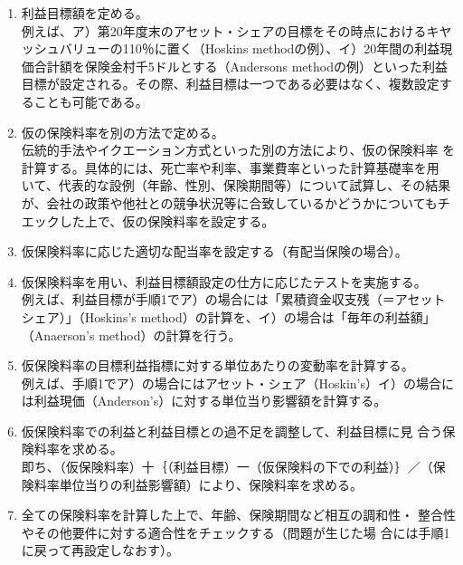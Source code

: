 \documentclass[report,gutter=10mm,fore-edge=10mm,uplatex,dvipdfmx]{jlreq}
\begin{document}
\begin{enumerate}
 \item 利益目標額を定める。\\
例えば、ア）第20年度末のアセット・シェアの目標をその時点におけるキヤッシュバリューの110％に置く（Hoskins methodの例）、イ）20年間の利益現価合計額を保険金村千5ドルとする（Andersons methodの例）といった利益目標が設定される。その際、利益目標は一つである必要はなく、複数設定することも可能である。
 \item 仮の保険料率を別の方法で定める。\\
伝統的手法やイクエーション方式といった別の方法により、仮の保険料率
を計算する。具体的には、死亡率や利率、事業費率といった計算基礎率を用
いて、代表的な設例（年齢、性別、保険期間等）について試算し、その結果
が、会社の政策や他社との競争状況等に合致しているかどうかについてもチ
エックした上で、仮の保険料率を設定する。
 \item 仮保険料率に応じた適切な配当率を設定する（有配当保険の場合）。
 \item 仮保険料率を用い、利益目標額設定の仕方に応じたテストを実施する。\\
例えば、利益目標が手順1でア）の場合には「累積資金収支残（＝アセット
シェア）」（Hoskins’s method）の計算を、イ）の場合は「毎年の利益額」
（Anaerson’s method）の計算を行う。
 \item 仮保険料率の目標利益指標に対する単位あたりの変動率を計算する。\\
例えば、手順1でア）の場合にはアセット・シェア（Hoskin's）イ）の場合に
は利益現価（Anderson’s）に対する単位当り影響額を計算する。
 \item 仮保険料率での利益と利益目標との過不足を調整して、利益目標に見
合う保険料率を求める。\\
即ち、（仮保険料率）十｛（利益目標）一（仮保険料の下での利益）｝／（保
険料率単位当りの利益影響額）により、保険料率を求める。
 \item 全ての保険料率を計算した上で、年齢、保険期間など相互の調和性・
整合性やその他要件に対する適合性をチェックする（問題が生じた場
合には手順1に戻って再設定しなおす）。
\end{enumerate}
\end{document}
